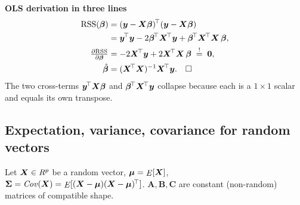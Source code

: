 \textbf{OLS derivation in three lines}
\begin{align*}
\mathrm{RSS}(\bbeta) &= (\yb-\Xb\bbeta)\T(\yb-\Xb\bbeta) \\
 &= \yb\T\yb - 2\bbeta\T\Xb\T\yb + \bbeta\T\Xb\T\Xb\,\bbeta, \\
\tfrac{\partial\mathrm{RSS}}{\partial\bbeta}
 &= -2\Xb\T\yb + 2\Xb\T\Xb\,\bbeta \;\overset{!}{=}\; \bm{0}, \\
\hat\bbeta &= (\Xb\T\Xb)^{-1}\Xb\T\yb. \quad\square
\end{align*}
The two cross-terms $\bm{y}^{\!\top}\bm{X}\bm{\beta}$ and $\bm{\beta}^{\!\top}\bm{X}^{\!\top}\bm{y}$ collapse
because each is a $1{\times}1$ scalar and equals its own transpose.


\subsection{Expectation, variance, covariance for random vectors}

Let $\bm{X}\in\mathit{R}^p$ be a random vector,
$\bm{\mu}=\mathop{\mathit{E}}[\bm{X}]$,
$\bm\Sigma=\mathop{\mathit{Cov}}(\bm{X})=\mathop{\mathit{E}}[(\bm{X}-\bm{\mu})(\bm{X}-\bm{\mu})^{\!\top}]$.
$\bm{A},\bm{B},\bm{C}$ are constant (non-random) matrices of compatible shape.

